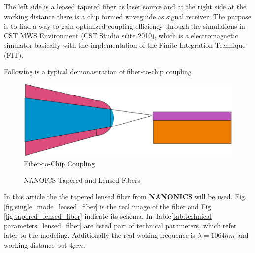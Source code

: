 The left side is a lensed tapered fiber as laser source and at the right side at the working distance there is a chip formed waveguide as signal receiver.  The purpose is to find a way to gain optimized coupling efficiency through the simulations in CST MWS Environment (CST Studio suite 2010), which is a electromagnetic simulator basically with the implementation of the Finite Integration Technique (FIT)\cite{ cst_help_siulation_method}. 


Following is a typical demonastration of fiber-to-chip coupling.
\begin{figure}
\includegraphics[width=.7\textwidth]{bilder/experiment_object}
\caption{Fiber-to-Chip Coupling}
\label{fig:experiment_object}
\end{figure}

\begin{figure}
\centering
{}
\hfill
{}
\label{fig:TLFs}
\caption{NANOICS Tapered and Lensed Fibers}
\end{figure}


In this article the the tapered lensed fiber from \textbf{NANONICS} will be used. Fig.\ref{fig:single_mode_lensed_fiber} is the real image of the fiber and Fig.\ref{fig:tapered_lensed_fiber} indicate its schema. In Table\ref{tab:technical parameters_lensed_fiber} are listed part of technical parameters, which refer later to the modeling. Additionally the real woking frequence is $\lambda=1064nm$ and working distance but $4\mu m$. 


